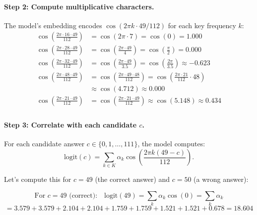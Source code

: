 \documentclass[11pt]{article}
\begin{document}
\paragraph{Step 2: Compute multiplicative characters.} The model's embedding encodes $\cos(2\pi k \cdot 49 / 112)$ for each key frequency $k$:
\begin{equation}
\begin{aligned}
    \cos\!\left(\frac{2\pi \cdot 16 \cdot 49}{112}\right) &= \cos(2\pi \cdot 7) = \cos(0) = 1.000 \\
    \cos\!\left(\frac{2\pi \cdot 28 \cdot 49}{112}\right) &= \cos\!\left(\frac{2\pi \cdot 49}{4}\right) = \cos\!\left(\frac{\pi}{2}\right) = 0.000 \\
    \cos\!\left(\frac{2\pi \cdot 32 \cdot 49}{112}\right) &= \cos\!\left(\frac{2\pi \cdot 49}{3.5}\right) = \cos\!\left(\frac{2\pi}{3.5}\right) \approx -0.623 \\
    \cos\!\left(\frac{2\pi \cdot 48 \cdot 49}{112}\right) &= \cos\!\left(\frac{2\pi \cdot 49 \cdot 48}{112}\right) = \cos\!\left(\frac{2\pi \cdot 21}{112} \cdot 48\right) \\
    &\approx \cos(4.712) \approx 0.000 \\
    \cos\!\left(\frac{2\pi \cdot 21 \cdot 49}{112}\right) &= \cos\!\left(\frac{2\pi \cdot 21 \cdot 49}{112}\right) \approx \cos(5.148) \approx 0.434 \\
\end{aligned}
\end{equation}

\paragraph{Step 3: Correlate with each candidate $c$.} For each candidate answer $c \in \{0, 1, \ldots, 111\}$, the model computes:
\begin{equation}
    \text{logit}(c) = \sum_{k \in K} \alpha_k \cos\!\left(\frac{2\pi k (49 - c)}{112}\right).
\end{equation}

Let's compute this for $c = 49$ (the correct answer) and $c = 50$ (a wrong answer):

\begin{equation}
\text{For } c = 49 \text{ (correct):} \quad \text{logit}(49) = \sum_k \alpha_k \cos(0) = \sum_k \alpha_k
\end{equation}
\begin{equation}
    = 3.579 + 3.579 + 2.104 + 2.104 + 1.759 + 1.759 + 1.521 + 1.521 + 0.678 = 18.604
\end{equation}
\end{document}
